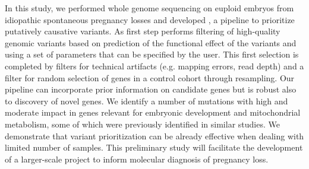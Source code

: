 In this study, we performed whole genome sequencing on euploid embryos from idiopathic spontaneous pregnancy losses and developed \gp\cite{gp2020}, a pipeline to prioritize putatively causative variants. As first step \gp performs filtering of high-quality genomic variants based on prediction of the functional effect of the variants and using a set of parameters that can be specified by the user. This first selection is completed by filters for technical artifacts (e.g. mapping errors, read depth) and a filter for random selection of genes in a control cohort through resampling. Our pipeline can incorporate prior information on candidate genes but is robust also to discovery of novel genes.  %
We identify a number of mutations with high and moderate impact in genes relevant for embryonic development and mitochondrial metabolism, some of which were previously identified in similar studies. We demonstrate that variant prioritization can be already effective when dealing with limited number of samples. This preliminary study will facilitate the development of a larger-scale project to inform molecular diagnosis of pregnancy loss. 





